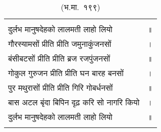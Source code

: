 {\bfseries
\setlength{\mylenone}{0pt}
\settowidth{\mylentwo}{दुर्लभ मानुषदेहको लालमती लाहो लियो}
\setlength{\mylenone}{\maxof{\mylenone}{\mylentwo}}
\settowidth{\mylentwo}{गौरस्यामसों प्रीति प्रीति जमुनाकुंजनसों}
\setlength{\mylenone}{\maxof{\mylenone}{\mylentwo}}
\settowidth{\mylentwo}{बंसीबटसों प्रीति प्रीति ब्रज रजपुंजनसों}
\setlength{\mylenone}{\maxof{\mylenone}{\mylentwo}}
\settowidth{\mylentwo}{गोकुल गुरुजन प्रीति प्रीति घन बारह बनसों}
\setlength{\mylenone}{\maxof{\mylenone}{\mylentwo}}
\settowidth{\mylentwo}{पुर मथुरासों प्रीति प्रीति गिरि गोबर्धनसों}
\setlength{\mylenone}{\maxof{\mylenone}{\mylentwo}}
\settowidth{\mylentwo}{बास अटल बृंदा बिपिन दृढ़ करि सो नागरि कियो}
\setlength{\mylenone}{\maxof{\mylenone}{\mylentwo}}
\settowidth{\mylentwo}{दुर्लभ मानुषदेहको लालमती लाहो लियो}
\setlength{\mylenone}{\maxof{\mylenone}{\mylentwo}}
\setlength{\mylentwo}{\baselineskip}
\setlength{\mylenone}{\mylenone + 1pt}
\begin{longtable}[l]{@{\hspace*{\mylen}}>{\setlength\parfillskip{0pt}}p{\mylenone}@{}@{}l@{}}
 & \\[-\the\mylentwo]
दुर्लभ मानुषदेहको लालमती लाहो लियो & ॥\\ \nopagebreak
गौरस्यामसों प्रीति प्रीति जमुनाकुंजनसों & ।\\ \nopagebreak
बंसीबटसों प्रीति प्रीति ब्रज रजपुंजनसों & ॥\\
गोकुल गुरुजन प्रीति प्रीति घन बारह बनसों & ।\\ \nopagebreak
पुर मथुरासों प्रीति प्रीति गिरि गोबर्धनसों & ॥\\
बास अटल बृंदा बिपिन दृढ़ करि सो नागरि कियो & ।\\ \nopagebreak
दुर्लभ मानुषदेहको लालमती लाहो लियो & ॥\\ \nopagebreak
\caption*{(भ.मा.~१९९)}
\end{longtable}
}

